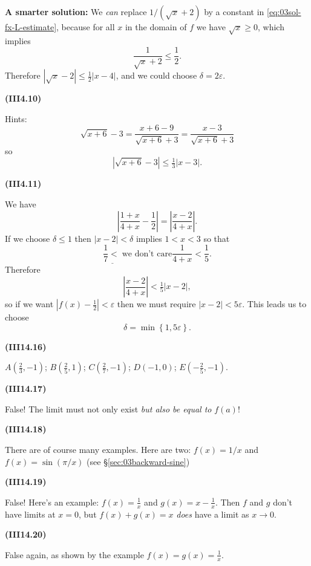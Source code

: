 \documentclass[openany,reqno]{amsbook}
\begin{document}
\begin{trivlist}
  \textbf{A smarter solution:} We \emph{can} replace $1/(\sqrt x +2)$
  by a constant in \eqref{eq:03sol-fx-L-estimate}, because for all $x$
  in the domain of $f$ we have $\sqrt x \geq0$, which implies
  \[
    \frac1{\sqrt x+ 2} \leq \frac 12.
  \]
  Therefore $|\sqrt x- 2| \leq \frac12|x-4|$, and we could choose
  $\delta = 2\varepsilon$.
  \bigskip

\item[{\bf(III4.10)}]

  Hints:
  \[
    \sqrt{x+6}-3 = \frac{x+6-9}{\sqrt{x+6} + 3} = \frac{x-3}{\sqrt{x+6} +
    3}
  \]
  so
  \[
    |\sqrt{x+6} - 3|\leq \tfrac13 |x-3|.
  \]
  \bigskip

\item[{\bf(III4.11)}]

  We have
  \[
    \left|\frac{1+x}{4+x} - \frac{1}{2}\right| =
    \left|\frac{x-2}{4+x}\right|.
  \]
  If we choose $\delta\le1$ then $|x-2|<\delta$ implies $1<x<3$ so that
  \[
    \underline{\frac17 <\;}{\text{we don't care}} \frac{1}{4+x} <
    \frac15.
  \]
  Therefore
  \[
    \left|\frac{x-2}{4+x}\right| < \tfrac15 |x-2|,
  \]
  so if we want $|f(x) - \tfrac12| <\varepsilon$ then we must require
  $|x-2|< 5\varepsilon$.  This leads us to choose
  \[
    \delta = \min\left\{ 1, 5\varepsilon \right\}.
  \]
  \bigskip

\item[{\bf(III14.16)}]

  $A (\frac23,-1)$; $B (\frac25, 1)$; $C (\frac27,-1)$; $D(-1,0)$;
  $E(-\frac25, -1)$.
  \bigskip

\item[{\bf(III14.17)}]

  False!  The limit must not only exist \textit{but also be equal to
  }$f(a)$!
  \bigskip

\item[{\bf(III14.18)}]

  There are of course many examples.  Here are two: $f(x) = 1/x$ and
  $f(x) = \sin(\pi/x)$ (see \S\ref{sec:03backward-sine})
  \bigskip

\item[{\bf(III14.19)}]

  False!  Here's an example: $f(x) = \frac1x$ and $g(x) = x-\frac1x$.
  Then $f$ and $g$ don't have limits at $x=0$, but $f(x) + g(x) = x$
  \textit{does} have a limit as $x\to0$.
  \bigskip

\item[{\bf(III14.20)}]

  False again, as shown by the example $f(x) = g(x) = \frac1x$.
  \bigskip


\end{trivlist}
\end{document}
